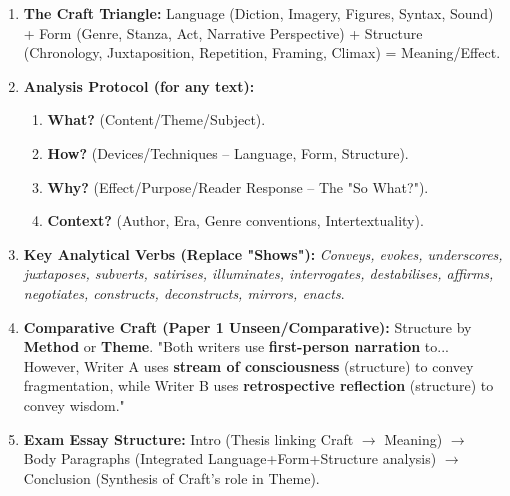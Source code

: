 \documentclass[11pt]{article}
\newcommand{\cle}[1]{{\popxbold\color{popdark}#1}}
\begin{document}
\begin{methode}
\begin{enumerate}
    \item \textbf{The Craft Triangle:} \cle{Language} (Diction, Imagery, Figures, Syntax, Sound) + \cle{Form} (Genre, Stanza, Act, Narrative Perspective) + \cle{Structure} (Chronology, Juxtaposition, Repetition, Framing, Climax) = \cle{Meaning/Effect}.
    \item \textbf{Analysis Protocol (for any text):}
    \begin{enumerate}
        \item \textbf{What?} (Content/Theme/Subject).
        \item \textbf{How?} (Devices/Techniques -- Language, Form, Structure).
        \item \textbf{Why?} (Effect/Purpose/Reader Response -- The "So What?").
        \item \textbf{Context?} (Author, Era, Genre conventions, Intertextuality).
    \end{enumerate}
    \item \textbf{Key Analytical Verbs (Replace "Shows"):} \textit{Conveys, evokes, underscores, juxtaposes, subverts, satirises, illuminates, interrogates, destabilises, affirms, negotiates, constructs, deconstructs, mirrors, enacts}.
    \item \textbf{Comparative Craft (Paper 1 Unseen/Comparative):} Structure by \textbf{Method} or \textbf{Theme}. "Both writers use \textbf{first-person narration} to... However, Writer A uses \textbf{stream of consciousness} (structure) to convey fragmentation, while Writer B uses \textbf{retrospective reflection} (structure) to convey wisdom."
    \item \textbf{Exam Essay Structure:} Intro (Thesis linking Craft $\rightarrow$ Meaning) $\rightarrow$ Body Paragraphs (Integrated Language+Form+Structure analysis) $\rightarrow$ Conclusion (Synthesis of Craft's role in Theme).
\end{enumerate}
\end{methode}
\end{document}
